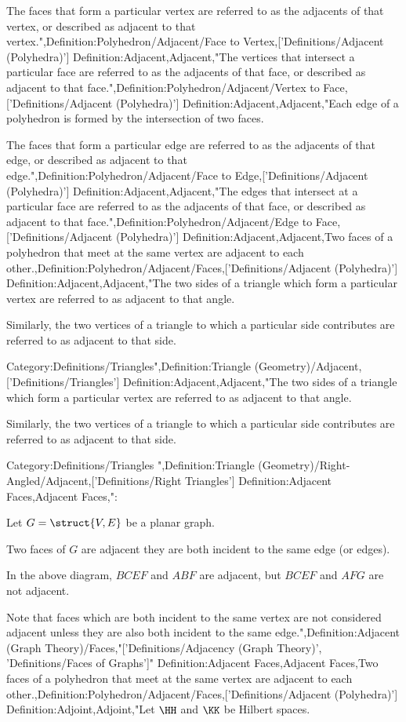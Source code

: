The faces that form a particular vertex are referred to as the adjacents of that vertex, or described as adjacent to that vertex.",Definition:Polyhedron/Adjacent/Face to Vertex,['Definitions/Adjacent (Polyhedra)']
Definition:Adjacent,Adjacent,"The vertices that intersect a particular face are referred to as the adjacents of that face, or described as adjacent to that face.",Definition:Polyhedron/Adjacent/Vertex to Face,['Definitions/Adjacent (Polyhedra)']
Definition:Adjacent,Adjacent,"Each edge of a polyhedron is formed by the intersection of two faces.

The faces that form a particular edge are referred to as the adjacents of that edge, or described as adjacent to that edge.",Definition:Polyhedron/Adjacent/Face to Edge,['Definitions/Adjacent (Polyhedra)']
Definition:Adjacent,Adjacent,"The edges that intersect at a particular face are referred to as the adjacents of that face, or described as adjacent to that face.",Definition:Polyhedron/Adjacent/Edge to Face,['Definitions/Adjacent (Polyhedra)']
Definition:Adjacent,Adjacent,Two faces of a polyhedron that meet at the same vertex are adjacent to each other.,Definition:Polyhedron/Adjacent/Faces,['Definitions/Adjacent (Polyhedra)']
Definition:Adjacent,Adjacent,"The two sides of a triangle which form a particular vertex are referred to as adjacent to that angle.

Similarly, the two vertices of a triangle to which a particular side contributes are referred to as adjacent to that side.


Category:Definitions/Triangles",Definition:Triangle (Geometry)/Adjacent,['Definitions/Triangles']
Definition:Adjacent,Adjacent,"The two sides of a triangle which form a particular vertex are referred to as adjacent to that angle.

Similarly, the two vertices of a triangle to which a particular side contributes are referred to as adjacent to that side.


Category:Definitions/Triangles
",Definition:Triangle (Geometry)/Right-Angled/Adjacent,['Definitions/Right Triangles']
Definition:Adjacent Faces,Adjacent Faces,":

Let $G = \struct {V, E}$ be a planar graph.

Two faces of $G$ are adjacent  they are both incident to the same edge (or edges).

In the above diagram, $BCEF$ and $ABF$ are adjacent, but $BCEF$ and $AFG$ are not adjacent.


Note that faces which are both incident to the same vertex are not considered adjacent unless they are also both incident to the same edge.",Definition:Adjacent (Graph Theory)/Faces,"['Definitions/Adjacency (Graph Theory)', 'Definitions/Faces of Graphs']"
Definition:Adjacent Faces,Adjacent Faces,Two faces of a polyhedron that meet at the same vertex are adjacent to each other.,Definition:Polyhedron/Adjacent/Faces,['Definitions/Adjacent (Polyhedra)']
Definition:Adjoint,Adjoint,"Let $\HH$ and $\KK$ be Hilbert spaces.

